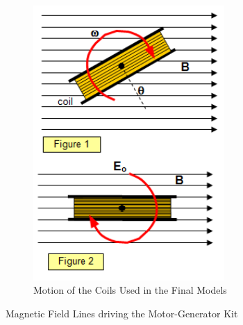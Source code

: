 \begin{figure}[ht]
            \begin{subfigure}[b]{0.5\linewidth}
                \centering
                \includegraphics[width=0.8\textwidth]{figures/moving_coil.png} %
                \caption{Motion of the Coils Used in the Final Models}
            \end{subfigure}
            \caption{Magnetic Field Lines driving the Motor-Generator Kit}
        \end{figure} \label{fig:moving_coil}

\clearpage
